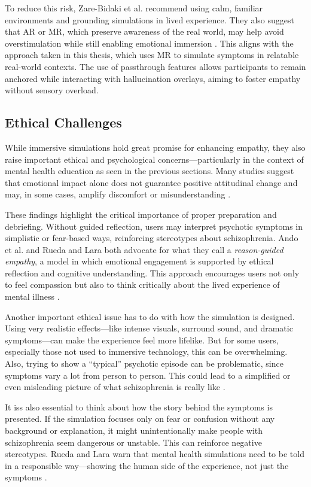 To reduce this risk, Zare-Bidaki et al. recommend using calm, familiar environments and grounding simulations in lived experience. They also suggest that AR or MR, which preserve awareness of the real world, may help avoid overstimulation while still enabling emotional immersion \cite{Zare-Bidaki2022}. This aligns with the approach taken in this thesis, which uses MR to simulate symptoms in relatable real-world contexts. The use of passthrough features allows participants to remain anchored while interacting with hallucination overlays, aiming to foster empathy without sensory overload.

\subsection{Ethical Challenges}

While immersive simulations hold great promise for enhancing empathy, they also raise important ethical and psychological concerns—particularly in the context of mental health education as seen in the previous sections. Many studies suggest that emotional impact alone does not guarantee positive attitudinal change and may, in some cases, amplify discomfort or misunderstanding \cite{Ando2011}.

These findings highlight the critical importance of proper preparation and debriefing. Without guided reflection, users may interpret psychotic symptoms in simplistic or fear-based ways, reinforcing stereotypes about schizophrenia. Ando et al. and Rueda and Lara both advocate for what they call a \textit{reason-guided empathy}, a model in which emotional engagement is supported by ethical reflection and cognitive understanding. This approach encourages users not only to feel compassion but also to think critically about the lived experience of mental illness \cite{Ando2011, Rueda2020}.

Another important ethical issue has to do with how the simulation is designed. Using very realistic effects—like intense visuals, surround sound, and dramatic symptoms—can make the experience feel more lifelike. But for some users, especially those not used to immersive technology, this can be overwhelming. Also, trying to show a “typical” psychotic episode can be problematic, since symptoms vary a lot from person to person. This could lead to a simplified or even misleading picture of what schizophrenia is really like \cite{Zare-Bidaki2022}.

It iss also essential to think about how the story behind the symptoms is presented. If the simulation focuses only on fear or confusion without any background or explanation, it might unintentionally make people with schizophrenia seem dangerous or unstable. This can reinforce negative stereotypes. Rueda and Lara warn that mental health simulations need to be told in a responsible way—showing the human side of the experience, not just the symptoms \cite{Rueda2020}.


